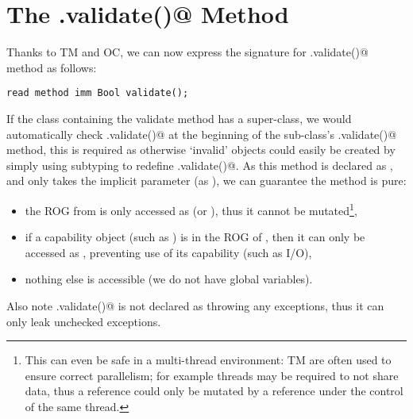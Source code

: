 \section{The \Q@.validate()@ Method}
\label{s:validate}
Thanks to TM and OC, we can now express the signature for \Q@.validate()@ method as follows:
\saveSpace
\begin{lstlisting}
read method imm Bool validate();
\end{lstlisting}
\saveSpace
If the class containing the validate method has a super-class, we would automatically check \Q@super.validate()@ at the beginning of the sub-class’s \Q@.validate()@ method, this is required as otherwise `invalid' objects could easily be created by simply using subtyping to redefine \Q@.validate()@.
As this method is declared as \Q@read@, and only takes the implicit parameter \Q@this@ (as \Q@read@), we can guarantee the method is pure:
\begin{itemize}
\item the ROG from \Q@this@ is only accessed as \Q@read@ (or \Q@imm@), thus it cannot be mutated\footnote{
This can even be safe in a multi-thread environment: TM are often used to ensure correct parallelism; for example threads may be required to not share \Q@mut@ data, thus a \Q@read@ reference could only be mutated by a \Q@mut@ reference under the control of the same thread.
},
\item if a capability object (such as \Q@System@) is in the ROG of \Q@this@, then it can only be accessed as \Q@read@, preventing use of its capability (such as I/O),
\item nothing else is accessible (we do not have global variables).
\end{itemize}

\noindent Also note \Q@.validate()@ is not declared as throwing any exceptions, thus it can only leak unchecked exceptions.


